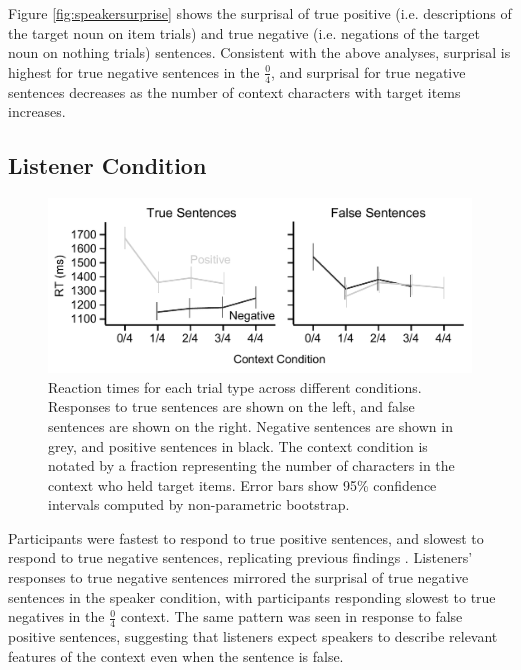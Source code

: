 \documentclass[man, noapacite]{apa2}
\begin{document}
Figure \ref{fig:speakersurprise} shows the surprisal of true positive (i.e. descriptions of the target noun on item trials) and true negative (i.e. negations of the target noun on nothing trials) sentences.  Consistent with the above analyses, surprisal is highest for true negative sentences in the $\frac{0}{4}$, and surprisal for true negative sentences decreases as the number of context characters with target items increases.

\subsection{Listener Condition}

\begin{figure}[t]
\begin{center} 
\includegraphics[width=5in]{figures/rts_mod.pdf}
\caption{\label{fig:e2line} Reaction times for each trial type across different conditions. Responses to true sentences are shown on the left, and false sentences are shown on the right.  Negative sentences are shown in grey, and positive sentences in black.  The context condition is notated by a fraction representing the number of characters in the context who held target items. Error bars show 95\% confidence intervals computed by non-parametric bootstrap.}
\end{center} 
\end{figure}

Participants were fastest to respond to true positive sentences, and slowest to respond to true negative sentences, replicating previous findings \cite{hclark1972}.  Listeners' responses to true negative sentences mirrored the surprisal of true negative sentences in the speaker condition, with participants responding slowest to true negatives in the $\frac{0}{4}$ context.  The same pattern was seen in response to false positive sentences, suggesting that listeners expect speakers to describe relevant features of the context even when the sentence is false.  
\end{document}
